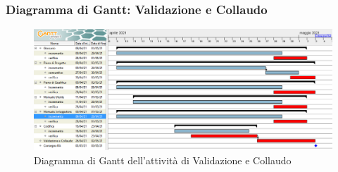 \subsubsection{Diagramma di Gantt: Validazione e Collaudo}
\begin{figure}[h]
	\includegraphics[scale=0.5]{Images/GanttValidazioneCollaudo.PNG}
	\caption{Diagramma di Gantt dell'attività di Validazione e Collaudo}
\end{figure}